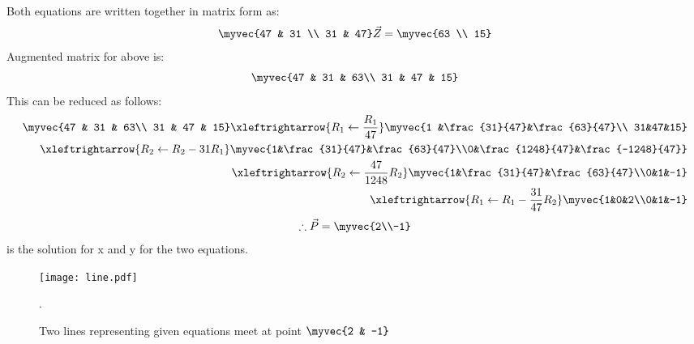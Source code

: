 \documentclass[journal,12pt,twocolumn]{IEEEtran}
\renewcommand\thesection{\arabic{section}}
\begin{document}
\begin{enumerate}[label=\thesection.\arabic*.,ref=\thesection.\theenumi]
\begin{enumerate}
Both equations are written together in matrix form as:
\begin{align}
    \myvec{47 & 31 \\ 31 & 47}\vec{Z}=
\myvec{63 \\ 15}
\end{align}
Augmented matrix for above is:
\begin{align}
    \myvec{47 & 31 & 63\\
           31 & 47 & 15}
\end{align}
This can be reduced as follows:
 \begin{align}
     \myvec{47 & 31 & 63\\
           31 & 47 & 15}
          \xleftrightarrow{R_1 \leftarrow \frac{R_1}{47}}
    \myvec{1 &\frac{31}{47}&\frac{63}{47}\\
        31&47&15}\\
        \xleftrightarrow{R_2\leftarrow R_2-31R_1}
    \myvec{1&\frac{31}{47}&\frac{63}{47}\\0&\frac{1248}{47}&\frac{-1248}{47}}\\
    \xleftrightarrow{R_2\leftarrow \frac{47}{1248}R_2}
    \myvec{1&\frac{31}{47}&\frac{63}{47}\\0&1&-1}\\
    \xleftrightarrow{R_1\leftarrow R_1-\frac{31}{47}R_2}
    \myvec{1&0&2\\0&1&-1}
 \end{align}
\begin{align}
\therefore \vec{P}=\myvec{2\\-1}
\end{align}
is the solution for x and y for the two equations.
\end{enumerate}
\begin{figure}[h]
\centering
\texttt{[image: line.pdf]}
\label{Fig 1.1}
\caption{Two lines representing given equations meet at point $\myvec{2 & -1}$ }.
\end{figure}
\end{enumerate}
\end{document}
